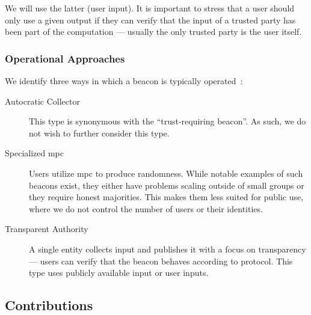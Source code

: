 We will use the latter (user input).
It is important to stress that a user should only use a given output if they can verify that the input of a trusted party has been part of the computation --- usually the only trusted party is the user itself.

\subsubsection{Operational Approaches}
We identify three ways in which a beacon is typically operated~:

\begin{description}
    \item[Autocratic Collector] This type is synonymous with the \enquote{trust-requiring beacon}. As such, we do not wish to further consider this type.

    \item [Specialized \acrshort{mpc}] Users utilize \acrfull{mpc} to produce randomness.
    While notable examples of such beacons exist, they either have problems scaling outside of small groups or they require honest majorities.
    This makes them less suited for public use, where we do not control the number of users or their identities.

    \item [Transparent Authority] A single entity collects input and publishes it with a focus on transparency --- users can verify that the beacon behaves according to protocol.
    This type uses publicly available input or user inputs.

\end{description}


\subsection{Contributions}
